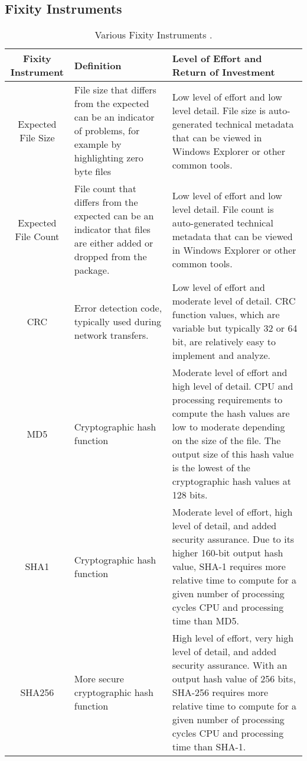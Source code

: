 \subsection{Fixity Instruments}
\begin{table}[p]
    \centering
    \begin{tabular}{c|p{}|p{}}
      Fixity Instrument & Definition & Level of Effort and Return of Investment\\
      \hline
      Expected File Size & File size that differs from the expected can be an indicator of problems, for example by highlighting zero byte files & Low level of effort and low level detail. File size is auto-generated technical metadata that can be viewed in Windows Explorer or other common tools. \\  
      \hline
      Expected File Count & File count that differs from the expected can be an indicator that files are either added or dropped from the package. & Low level of effort and low level detail. File count is auto-generated technical metadata that can be viewed in Windows Explorer or other common tools.  \\
     \hline
     CRC & Error detection code, typically used during network transfers. & Low level of effort and moderate level of detail. CRC function values, which are variable but typically 32 or 64 bit, are relatively easy to implement and analyze.  \\
     \hline
     MD5 & Cryptographic hash function & Moderate level of effort and high level of detail. CPU and processing requirements to compute the hash values are low to moderate depending on the size of the file. The output size of this hash value is the lowest of the cryptographic hash values at 128 bits.  \\
     \hline
     SHA1 & Cryptographic hash function & Moderate level of effort, high level of detail, and added security assurance. Due to its higher 160-bit output hash value, SHA-1 requires more relative time to compute for a given number of processing cycles CPU and processing time than MD5.  \\
     \hline
     SHA256 & More secure cryptographic hash function & High level of effort, very high level of detail, and added security assurance. With an output hash value of 256 bits, SHA-256 requires more relative time to compute for a given number of processing cycles CPU and processing time than SHA-1. 
    \end{tabular}
    \caption{Various Fixity Instruments \cite[5]{ndsa2017fixity}.}
    \label{tb:fixity-instruments}
\end{table}
